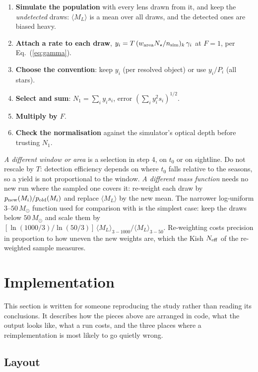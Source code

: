 \documentclass[english,10pt,a4paper]{article}
\begin{document}
	\begin{enumerate}
		\item \textbf{Simulate the population} with every lens drawn from it, and keep the \emph{undetected} draws: $\langle M_L\rangle$ is a mean over all draws, and the detected ones are biased heavy.
		\item \textbf{Attach a rate to each draw}, $y_i = T\,(w_{\rm area}N_\star/n_{\rm sim})_k\,\gamma_i$ at $F=1$, per Eq.~(\ref{eq:gamma}).
		\item \textbf{Choose the convention}: keep $y_i$ (per resolved object) or use $y_i/P_i$ (all stars).
		\item \textbf{Select and sum}: $N_1 = \sum_i y_i s_i$, error $(\sum_i y_i^2 s_i)^{1/2}$.
		\item \textbf{Multiply by $F$}.
		\item \textbf{Check the normalisation} against the simulator's optical depth before trusting $N_1$.
	\end{enumerate}

	\emph{A different window or area} is a selection in step 4, on $t_0$ or on sightline. Do not rescale by $T$: detection efficiency depends on where $t_0$ falls relative to the seasons, so a yield is not proportional to the window. \emph{A different mass function} needs no new run where the sampled one covers it: re-weight each draw by $p_{\rm new}(M_i)/p_{\rm old}(M_i)$ and replace $\langle M_L\rangle$ by the new mean. The narrower log-uniform $3$--$50\,M_\odot$ function used for comparison with \cite{SajadianSahu2023} is the simplest case: keep the draws below $50\,M_\odot$ and scale them by $[\ln(1000/3)/\ln(50/3)]\,\langle M_L\rangle_{3-1000}/\langle M_L\rangle_{3-50}$. Re-weighting costs precision in proportion to how uneven the new weights are, which the Kish $N_{\rm eff}$ of the re-weighted sample measures.

	\section{Implementation}
	\label{sec:implementation}

	This section is written for someone reproducing the study rather than reading its conclusions. It describes how the pieces above are arranged in code, what the output looks like, what a run costs, and the three places where a reimplementation is most likely to go quietly wrong.

	\subsection{Layout}
\end{document}
